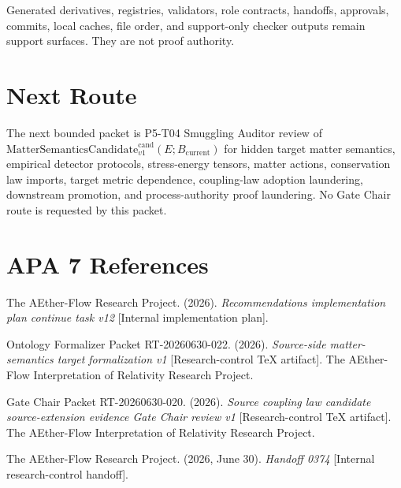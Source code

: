 \documentclass[11pt]{article}
\newcommand{\Bcur}{B_{\mathrm{current}}}
\newcommand{\MSCand}{\mathrm{MatterSemanticsCandidate}^{\mathrm{cand}}_{v1}}
\begin{document}
Generated derivatives, registries, validators, role contracts, handoffs,
approvals, commits, local caches, file order, and support-only checker outputs
remain support surfaces. They are not proof authority.

\section{Next Route}

The next bounded packet is P5-T04 Smuggling Auditor review of
\(\MSCand(E;\Bcur)\) for hidden target matter semantics, empirical detector
protocols, stress-energy tensors, matter actions, conservation law imports,
target metric dependence, coupling-law adoption laundering, downstream
promotion, and process-authority proof laundering. No Gate Chair route is
requested by this packet.

\section{APA 7 References}

The AEther-Flow Research Project. (2026). \emph{Recommendations
implementation plan continue task v12} [Internal implementation plan].

Ontology Formalizer Packet RT-20260630-022. (2026).
\emph{Source-side matter-semantics target formalization v1}
[Research-control TeX artifact]. The AEther-Flow Interpretation of Relativity
Research Project.

Gate Chair Packet RT-20260630-020. (2026). \emph{Source coupling law
candidate source-extension evidence Gate Chair review v1}
[Research-control TeX artifact]. The AEther-Flow Interpretation of Relativity
Research Project.

The AEther-Flow Research Project. (2026, June 30). \emph{Handoff 0374}
[Internal research-control handoff].
\end{document}
